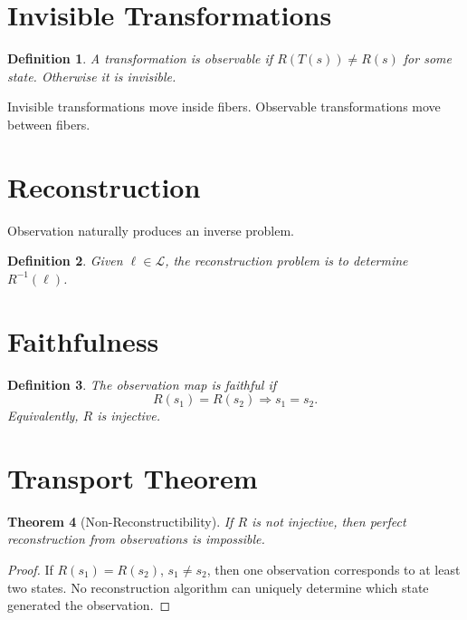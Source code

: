 \documentclass[11pt]{amsart}
\newtheorem{definition}{Definition}[section]
\newtheorem{theorem}[definition]{Theorem}
\begin{document}
\section{Invisible Transformations}

\begin{definition}
A transformation is observable if $R(T(s)) \neq R(s)$ for some state.
Otherwise it is invisible.
\end{definition}

Invisible transformations move inside fibers.
Observable transformations move between fibers.

\section{Reconstruction}

Observation naturally produces an inverse problem.

\begin{definition}
Given $\ell \in \mathcal{L}$, the reconstruction problem is to determine
$R^{-1}(\ell)$.
\end{definition}

\section{Faithfulness}

\begin{definition}
The observation map is faithful if
\[
R(s_1) = R(s_2) \Longrightarrow s_1 = s_2.
\]
Equivalently, $R$ is injective.
\end{definition}

\section{Transport Theorem}

\begin{theorem}[Non-Reconstructibility]
If $R$ is not injective, then perfect reconstruction from observations
is impossible.
\end{theorem}

\begin{proof}
If $R(s_1) = R(s_2)$, $s_1 \neq s_2$, then one observation corresponds
to at least two states. No reconstruction algorithm can uniquely determine
which state generated the observation.
\end{proof}
\end{document}
